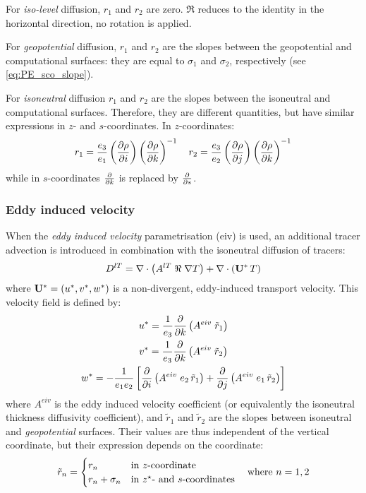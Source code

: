 \documentclass[../main/NEMO_manual]{subfiles}
\begin{document}
For \textit{iso-level} diffusion, $r_1$ and $r_2 $ are zero.
$\Re$ reduces to the identity in the horizontal direction, no rotation is applied.

For \textit{geopotential} diffusion,
$r_1$ and $r_2 $ are the slopes between the geopotential and computational surfaces:
they are equal to $\sigma_1$ and $\sigma_2$, respectively (see \autoref{eq:PE_sco_slope}).

For \textit{isoneutral} diffusion $r_1$ and $r_2$ are the slopes between the isoneutral and computational surfaces.
Therefore, they are different quantities, but have similar expressions in $z$- and $s$-coordinates.
In $z$-coordinates:
\begin{equation}
  \label{eq:PE_iso_slopes}
  r_1 = \frac{e_3}{e_1}	\lt( \pd[\rho]{i} \rt) \lt( \pd[\rho]{k} \rt)^{-1} \quad
  r_2 = \frac{e_3}{e_2}	\lt( \pd[\rho]{j} \rt) \lt( \pd[\rho]{k} \rt)^{-1}
\end{equation}
while in $s$-coordinates $\pd[]{k}$ is replaced by $\pd[]{s}$.

\subsubsection{Eddy induced velocity}

When the \textit{eddy induced velocity} parametrisation (eiv) \citep{Gent1990} is used,
an additional tracer advection is introduced in combination with the isoneutral diffusion of tracers:
\[
  D^{lT} = \nabla \cdot \lt( A^{lT} \; \Re \; \nabla T \rt) + \nabla \cdot \lt( \vect U^\ast \, T \rt)
\]
where $ \vect U^\ast = \lt( u^\ast,v^\ast,w^\ast \rt)$ is a non-divergent,
eddy-induced transport velocity. This velocity field is defined by:
\begin{gather}
  u^\ast =   \frac{1}{e_3}            \pd[]{k} \lt( A^{eiv} \;        \tilde{r}_1 \rt) \\
  v^\ast =   \frac{1}{e_3}            \pd[]{k} \lt( A^{eiv} \;        \tilde{r}_2 \rt) \\
  w^\ast = - \frac{1}{e_1 e_2} \lt[   \pd[]{i} \lt( A^{eiv} \; e_2 \, \tilde{r}_1 \rt)
                                     + \pd[]{j} \lt( A^{eiv} \; e_1 \, \tilde{r}_2 \rt) \rt]
\end{gather}
where $A^{eiv}$ is the eddy induced velocity coefficient
(or equivalently the isoneutral thickness diffusivity coefficient),
and $\tilde r_1$ and $\tilde r_2$ are the slopes between isoneutral and \textit{geopotential} surfaces.
Their values are thus independent of the vertical coordinate, but their expression depends on the coordinate: 
\begin{align}
  \label{eq:PE_slopes_eiv}
  \tilde{r}_n =
    \begin{cases}
      r_n            & \text{in $z$-coordinate}                \\
      r_n + \sigma_n & \text{in \zstar- and $s$-coordinates}
    \end{cases}
  \quad \text{where~} n = 1, 2
\end{align}
\end{document}
